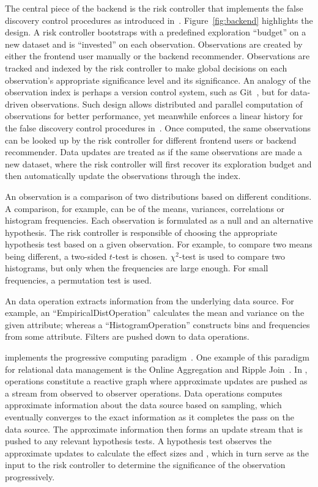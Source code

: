 The central piece of the \system{} backend is the risk controller that implements the false discovery control procedures as introduced in~\cite{zhao2016controlling}.  Figure~\ref{fig:backend} highlights the design.  A risk controller bootstraps with a predefined exploration ``budget'' on a new dataset and is ``invested'' on each observation.  Observations are created by either the frontend user manually or the backend recommender.  Observations are tracked and indexed by the risk controller to make global decisions on each observation's appropriate significance level and its significance. An analogy of the observation index is perhaps a version control system, such as Git~\cite{torvalds2010git}, but for data-driven observations. Such design allows distributed and parallel computation of observations for better performance, yet meanwhile enforces a linear history for the false discovery control procedures in~\cite{zhao2016controlling}. Once computed, the same observations can be looked up by the risk controller for different frontend users or backend recommender. Data updates are treated as if the same observations are made a new dataset, where the risk controller will first recover its exploration budget and then automatically update the observations through the index.

An observation is a comparison of two distributions based on different conditions.  A comparison, for example, can be of the means, variances, correlations or histogram frequencies. Each observation is formulated as a null and an alternative hypothesis.  The risk controller is responsible of choosing the appropriate hypothesis test based on a given observation.  For example, to compare two means being different, a two-sided $t$-test is chosen.  $\chi^2$-test is used to compare two histograms, but only when the frequencies are large enough. For small frequencies, a permutation test is used. 

An data operation extracts information from the underlying data source.  For example, an ``EmpiricalDistOperation'' calculates the mean and variance on the given attribute; whereas a ``HistogramOperation'' constructs bins and frequencies from some attribute.  Filters are pushed down to data operations.

\system{} implements the progressive computing paradigm~\cite{vizdom, zgraggen2016progressive}.  One example of this paradigm for relational data management is the Online Aggregation and Ripple Join~\cite{onlineagg, ripplejoins}.  In \system{}, operations constitute a reactive graph where approximate updates are pushed as a stream from observed to observer operations. Data operations computes approximate information about the data source based on sampling, which eventually converges to the exact information as it completes the pass on the data source. The approximate information then forms an update stream that is pushed to any relevant hypothesis tests. A hypothesis test observes the approximate updates to calculate the effect sizes and \pvals, which in turn serve as the input to the risk controller to determine the significance of the observation progressively. 